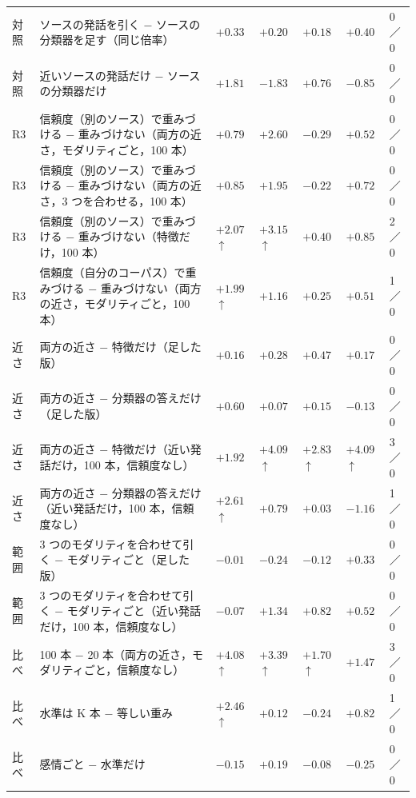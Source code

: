 \begin{longtable}{>{\raggedright}p{0.75cm}>{\raggedright}p{5.6cm}>{\raggedright}p{2.05cm}>{\raggedright}p{2.05cm}>{\raggedright}p{2.05cm}>{\raggedright}p{2.05cm}p{0.75cm}}
対照 & ソースの発話を引く $-$ ソースの分類器を足す（同じ倍率） & $+0.33$ & $+0.20$ & $+0.18$ & $+0.40$ & 0／0 \\
対照 & 近いソースの発話だけ $-$ ソースの分類器だけ & $+1.81$ & $-1.83$ & $+0.76$ & $-0.85$ & 0／0 \\
R3 & 信頼度（別のソース）で重みづける $-$ 重みづけない（両方の近さ，モダリティごと，100 本） & $+0.79$ & $+2.60$ & $-0.29$ & $+0.52$ & 0／0 \\
R3 & 信頼度（別のソース）で重みづける $-$ 重みづけない（両方の近さ，3 つを合わせる，100 本） & $+0.85$ & $+1.95$ & $-0.22$ & $+0.72$ & 0／0 \\
R3 & 信頼度（別のソース）で重みづける $-$ 重みづけない（特徴だけ，100 本） & $+2.07$$\uparrow$ & $+3.15$$\uparrow$ & $+0.40$ & $+0.85$ & 2／0 \\
R3 & 信頼度（自分のコーパス）で重みづける $-$ 重みづけない（両方の近さ，モダリティごと，100 本） & $+1.99$$\uparrow$ & $+1.16$ & $+0.25$ & $+0.51$ & 1／0 \\
近さ & 両方の近さ $-$ 特徴だけ（足した版） & $+0.16$ & $+0.28$ & $+0.47$ & $+0.17$ & 0／0 \\
近さ & 両方の近さ $-$ 分類器の答えだけ（足した版） & $+0.60$ & $+0.07$ & $+0.15$ & $-0.13$ & 0／0 \\
近さ & 両方の近さ $-$ 特徴だけ（近い発話だけ，100 本，信頼度なし） & $+1.92$ & $+4.09$$\uparrow$ & $+2.83$$\uparrow$ & $+4.09$$\uparrow$ & 3／0 \\
近さ & 両方の近さ $-$ 分類器の答えだけ（近い発話だけ，100 本，信頼度なし） & $+2.61$$\uparrow$ & $+0.79$ & $+0.03$ & $-1.16$ & 1／0 \\
範囲 & 3 つのモダリティを合わせて引く $-$ モダリティごと（足した版） & $-0.01$ & $-0.24$ & $-0.12$ & $+0.33$ & 0／0 \\
範囲 & 3 つのモダリティを合わせて引く $-$ モダリティごと（近い発話だけ，100 本，信頼度なし） & $-0.07$ & $+1.34$ & $+0.82$ & $+0.52$ & 0／0 \\
比べ & 100 本 $-$ 20 本（両方の近さ，モダリティごと，信頼度なし） & $+4.08$$\uparrow$ & $+3.39$$\uparrow$ & $+1.70$$\uparrow$ & $+1.47$ & 3／0 \\
比べ & 水準は K 本 $-$ 等しい重み & $+2.46$$\uparrow$ & $+0.12$ & $-0.24$ & $+0.82$ & 1／0 \\
比べ & 感情ごと $-$ 水準だけ & $-0.15$ & $+0.19$ & $-0.08$ & $-0.25$ & 0／0 \\
\end{longtable}
